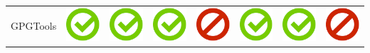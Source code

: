 \documentclass[10pt,foldmark,tumble]{leaflet}
\begin{document}
{\begin{tabular}{ L{2cm} | C{2cm} | C{2cm} | C{2cm} | C{2cm} | C{2cm} | C{2cm} | C{2cm} | }
GPGTools & \includegraphics[scale=0.1]{pics/haken.png} & \includegraphics[scale=0.1]{pics/haken.png} & \includegraphics[scale=0.1]{pics/haken.png} & \includegraphics[scale=0.1]{pics/nohaken.png} & \includegraphics[scale=0.1]{pics/haken.png} & \includegraphics[scale=0.1]{pics/haken.png} & \includegraphics[scale=0.1]{pics/nohaken.png} \tabularnewline

\end{tabular}}
\end{document}
